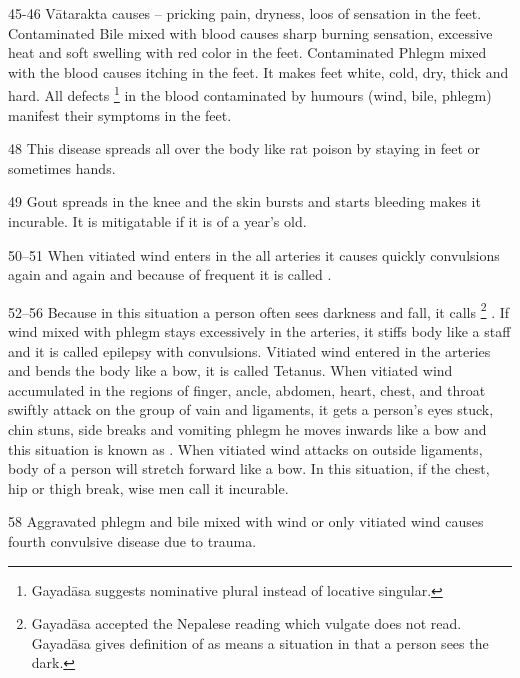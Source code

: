 \begin{translation}
\item[45-46] Vātarakta causes -- pricking pain, dryness, loos of sensation in the feet. Contaminated Bile mixed with blood causes sharp burning sensation, excessive heat and soft swelling with red color in the feet. Contaminated Phlegm mixed with the blood causes itching in the feet. It makes feet white, cold, dry, thick and hard. All defects \footnote{Gayadāsa suggests  nominative plural instead of locative singular.} in the blood contaminated by humours (wind, bile, phlegm) manifest their symptoms in the feet.

\item[48] This disease spreads all over the body like rat poison by staying in feet or sometimes hands.

\item[49] Gout spreads in the knee and the skin bursts and starts bleeding makes it incurable. It is mitigatable if it is of a year’s old.

\item[50--51] When vitiated wind enters in the all arteries it causes
quickly convulsions again and again and because of frequent
 it is called .

\item[52--56] Because in this situation a person often sees darkness and
fall, it calls  \footnote{Gayadāsa
    accepted the Nepalese reading  which vulgate does not read.
    Gayadāsa gives definition of  as  means a
    situation in that a person sees the dark.} . If wind mixed with phlegm
    stays excessively in the arteries, it stiffs body like a staff and it is
    called  epilepsy with convulsions. Vitiated wind entered
    in the arteries and bends the body like a bow, it is called
     Tetanus. When vitiated wind accumulated in the regions
    of finger, ancle, abdomen, heart, chest, and throat swiftly attack on the
    group of vain and ligaments, it gets a person’s eyes stuck, chin stuns,
    side breaks and vomiting phlegm he moves inwards like a bow and this
    situation is known as . When vitiated wind
    attacks on outside ligaments, body of a person will stretch forward like
    a bow. In this situation, if the chest, hip or thigh break, wise men call
    it incurable.

\item[58] Aggravated phlegm and bile mixed with wind or only vitiated wind causes fourth convulsive disease due to trauma.


\end{translation}
